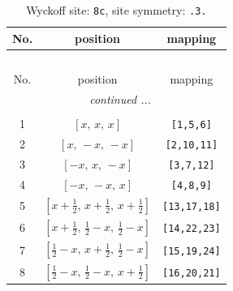 \documentclass[fleqn,8pt]{jsarticle}
\begin{document}
\renewcommand{\arraystretch}{1.2}
\begin{longtable}{ccc}
\caption{Wyckoff site: {\tt 8c}, site symmetry: {\tt .3.}}
 \\
 \hline \hline
No. & position & mapping \\ \hline \endfirsthead

\multicolumn{2}{l}{\tablename\ \thetable{}} \\
 \hline \hline
No. & position & mapping \\ \hline \endhead

 \hline \hline
\multicolumn{2}{r}{\footnotesize\it continued ...} \\ \endfoot

 \hline \hline
\multicolumn{2}{r}{} \\ \endlastfoot

1 & $\left[ x,\, x,\, x \right]$ & {\tt [1,5,6]} \\ \hline
2 & $\left[ x,\, - x,\, - x \right]$ & {\tt [2,10,11]} \\ \hline
3 & $\left[ - x,\, x,\, - x \right]$ & {\tt [3,7,12]} \\ \hline
4 & $\left[ - x,\, - x,\, x \right]$ & {\tt [4,8,9]} \\ \hline
5 & $\left[ x + \frac{1}{2},\, x + \frac{1}{2},\, x + \frac{1}{2} \right]$ & {\tt [13,17,18]} \\ \hline
6 & $\left[ x + \frac{1}{2},\, \frac{1}{2} - x,\, \frac{1}{2} - x \right]$ & {\tt [14,22,23]} \\ \hline
7 & $\left[ \frac{1}{2} - x,\, x + \frac{1}{2},\, \frac{1}{2} - x \right]$ & {\tt [15,19,24]} \\ \hline
8 & $\left[ \frac{1}{2} - x,\, \frac{1}{2} - x,\, x + \frac{1}{2} \right]$ & {\tt [16,20,21]} \\
\end{longtable}
\renewcommand{\arraystretch}{1.2}
\end{document}
